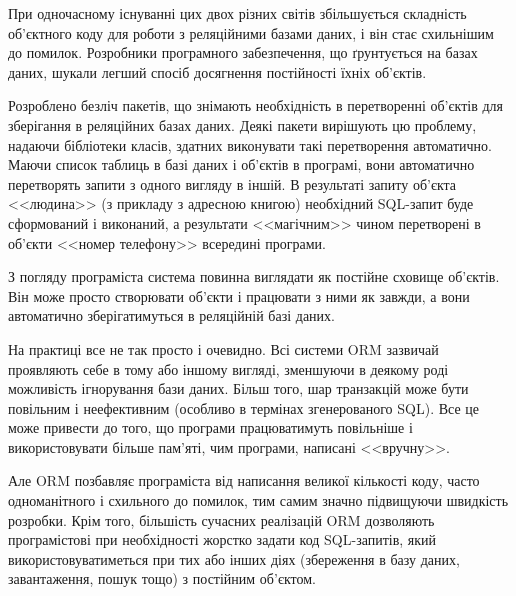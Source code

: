 При одночасному існуванні цих двох різних світів збільшується складність об'єктного коду для роботи з реляційними базами даних, і він стає схильнішим до помилок. Розробники програмного забезпечення, що ґрунтується на базах даних, шукали легший спосіб досягнення постійності їхніх об'єктів.
\par Розроблено безліч пакетів, що знімають необхідність в перетворенні об'єктів для зберігання в реляційних базах даних.
Деякі пакети вирішують цю проблему, надаючи бібліотеки класів, здатних виконувати такі перетворення автоматично. Маючи список таблиць в базі даних і об'єктів в програмі, вони автоматично перетворять запити з одного вигляду в іншій. В результаті запиту об'єкта <<людина>> (з прикладу з адресною книгою) необхідний SQL-запит буде сформований і виконаний, а результати <<магічним>> чином перетворені в об'єкти <<номер телефону>> всередині програми.
\par З погляду програміста система повинна виглядати як постійне сховище об'єктів. Він може просто створювати об'єкти і працювати з ними як завжди, а вони автоматично зберігатимуться в реляційній базі даних.
\par На практиці все не так просто і очевидно. Всі системи ORM зазвичай проявляють себе в тому або іншому вигляді, зменшуючи в деякому роді можливість ігнорування бази даних. Більш того, шар транзакцій може бути повільним і неефективним (особливо в термінах згенерованого SQL). Все це може привести до того, що програми працюватимуть повільніше і використовувати більше пам'яті, чим програми, написані <<вручну>>.
\par Але ORM позбавляє програміста від написання великої кількості коду, часто одноманітного і схильного до помилок, тим самим значно підвищуючи швидкість розробки. Крім того, більшість сучасних реалізацій ORM дозволяють програмістові при необхідності жорстко задати код SQL-запитів, який використовуватиметься при тих або інших діях (збереження в базу даних, завантаження, пошук тощо) з постійним об'єктом.

